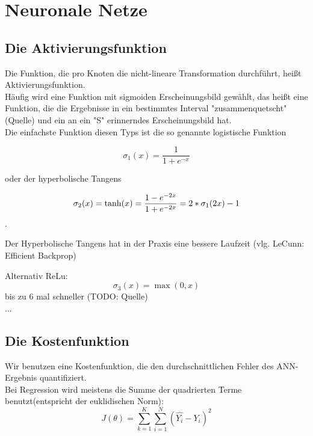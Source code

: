 \section{Neuronale Netze} %

\subsection{Die Aktivierungsfunktion}
Die Funktion, die pro Knoten die nicht-lineare Transformation durchführt, heißt Aktivierungsfunktion. \\
Häufig wird eine Funktion mit sigmoiden Erscheinungsbild gewählt, das heißt eine Funktion, die die Ergebnisse in ein bestimmtes Interval "zusammenquetscht" (Quelle) und ein an ein "S" erinnerndes Erscheinungsbild hat. 
\\
Die einfachste Funktion diesen Typs ist die so genannte logistische Funktion

\begin{equation}
\sigma_1(x) = \frac{1}{1+e^{-x}}
\end{equation}

oder der hyperbolische Tangens

\begin{equation}
\sigma_2(x) = \tanh(x) = \frac{1-e^{-2x}}{1+e^{-2x}} = \\
2 * \sigma_1(2x) -1
\end{equation}.

Der Hyperbolische Tangens hat in der Praxis eine bessere Laufzeit (vlg. LeCunn: Efficient Backprop)

Alternativ ReLu:
\begin{equation}
\sigma_3(x) = \max(0,x)
\end{equation} bis zu 6 mal schneller (TODO: Quelle) \\
...

\subsection{Die Kostenfunktion}
Wir benutzen eine Kostenfunktion, die den durchschnittlichen Fehler des ANN-Ergebnis quantifiziert.\\

Bei Regression wird meistens die Summe der quadrierten Terme benutzt(entspricht der euklidischen Norm): 
\begin{equation}
J(\theta) = \sum_{k=1}^K \sum_{i=1}^N \left( \hat{Y_i} - Y_i \right)^2
\end{equation}

